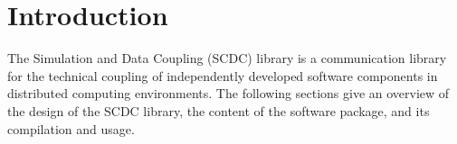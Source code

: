 \chapter{Introduction}

The Simulation and Data Coupling (SCDC) library is a communication library for the technical coupling of independently developed software components in distributed computing environments.
The following sections give an overview of the design of the SCDC library, the content of the software package, and its compilation and usage.




